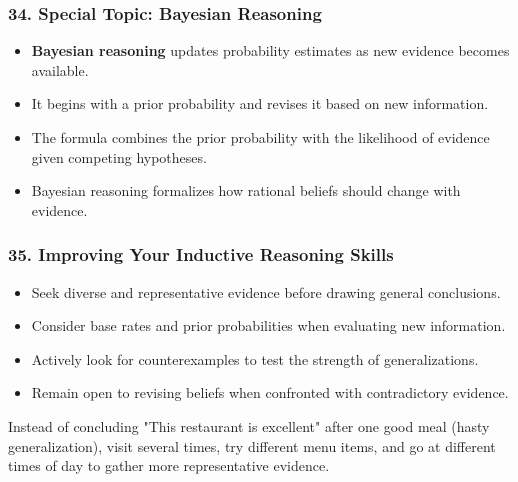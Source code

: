 \documentclass{beamer}
\begin{document}
\begin{frame}
\frametitle{34. Special Topic: Bayesian Reasoning}
\begin{itemize}
    \item \textbf{Bayesian reasoning} updates probability estimates as new evidence becomes available.
    \item It begins with a prior probability and revises it based on new information.
    \item The formula combines the prior probability with the likelihood of evidence given competing hypotheses.
    \item Bayesian reasoning formalizes how rational beliefs should change with evidence.
\end{itemize}

\end{frame}

\begin{frame}
\frametitle{35. Improving Your Inductive Reasoning Skills}
\begin{itemize}
    \item Seek diverse and representative evidence before drawing general conclusions.
    \item Consider base rates and prior probabilities when evaluating new information.
    \item Actively look for counterexamples to test the strength of generalizations.
    \item Remain open to revising beliefs when confronted with contradictory evidence.
\end{itemize}

\begin{example}
Instead of concluding "This restaurant is excellent" after one good meal (hasty generalization), visit several times, try different menu items, and go at different times of day to gather more representative evidence.
\end{example}
\end{frame}
\end{document}
